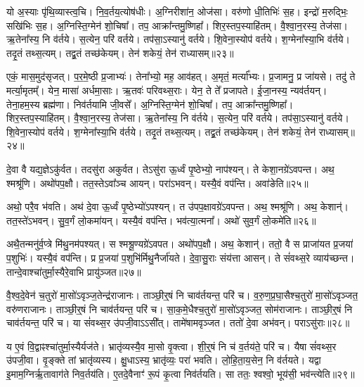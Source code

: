 यो अ॒स्याः पृ॑थि॒व्यास्त्व॒चि।
नि॒व॒र्तय॒त्योष॑धीः।
अ॒ग्निरीशा॑न॒ ओज॑सा।
वरु॑णो धी॒तिभिः॑ स॒ह।
इन्द्रो॑ म॒रुद्भिः॒ सखि॑भिः स॒ह।
अ॒ग्निस्ति॒ग्मेन॑ शो॒चिषा᳚।
तप॒ आक्रा᳚न्तमु॒ष्णिहा᳚।
शिर॒स्तप॒स्याहि॑तम्।
वै॒श्वा॒न॒रस्य॒ तेज॑सा।
ऋ॒तेना᳚स्य॒ नि व॑र्तये।
स॒त्येन॒ परि॑ वर्तये।
तप॑सा॒\-ऽस्यानु॑ वर्तये।
शि॒वेना॒स्योप॑ वर्तये।
श॒ग्मेना᳚स्या॒भि व॑र्तये।
तदृ॒तं तथ्स॒त्यम्।
तद्व्र॒तं तच्छ॑केयम्।
तेन॑ शकेयं॒ तेन॑ राध्यासम्॥२३॥\ip

एकं॒ मास॒मुद॑\-सृजत्।
प॒र॒मे॒ष्ठी प्र॒जाभ्यः॑।
तेना᳚भ्यो॒ मह॒ आव॑हत्।
अ॒मृतं॒ मर्त्या᳚भ्यः।
प्र॒जामनु॒ प्र जा॑यसे।
तदु॑ ते मर्त्या॒मृतम्᳚।
येन॒ मासा॑ अर्धमा॒साः।
ऋ॒तवः॑ परिवथ्स॒राः।
येन॒ ते ते᳚ प्रजापते।
ई॒जा॒नस्य॒ न्यव॑र्तयन्।
तेना॒हम॒स्य ब्रह्म॑णा।
निव॑र्तयामि जी॒वसे᳚।
अ॒ग्निस्ति॒ग्मेन॑ शो॒चिषा᳚।
तप॒ आक्रा᳚न्तमु॒ष्णिहा᳚।
शिर॒स्तप॒स्याहि॑तम्।
वै॒श्वा॒न॒रस्य॒ तेज॑सा।
ऋ॒तेना᳚स्य॒ नि व॑र्तये।
स॒त्येन॒ परि॑ वर्तये।
तप॑सा॒\-ऽस्यानु॑ वर्तये।
शि॒वेना॒स्योप॑ वर्तये।
श॒ग्मेना᳚स्या॒भि व॑र्तये।
तदृ॒तं तथ्स॒त्यम्।
तद्व्र॒तं तच्छ॑केयम्।
तेन॑ शकेयं॒ तेन॑ राध्यासम्॥२४॥\ip{}

दे॒वा वै यद्य॒ज्ञे\-ऽकु॑र्वत।
तदसु॑रा अकुर्वत।
तेऽसु॑रा ऊ॒र्ध्वं पृ॒ष्ठेभ्यो॒ नाप॑श्यन्।
ते केशा॒नग्रे॑\-ऽवपन्त।
अथ॒ श्मश्रू॑णि।
अथो॑प\-प॒क्षौ।
तत॒स्ते\-ऽवा᳚ञ्च आयन्।
परा॑ऽभवन्।
यस्यै॒वं वप॑न्ति।
अवा॑ङेति॥२५॥\ip

अथो॒ परै॒व भ॑वति।
अथ॑ दे॒वा ऊ॒र्ध्वं पृ॒ष्ठेभ्यो॑\-ऽपश्यन्।
त उ॑पप॒क्षावग्रे॑\-ऽवपन्त।
अथ॒ श्मश्रू॑णि।
अथ॒ केशान्॑।
तत॒स्ते॑\-ऽभवन्।
सु॒व॒र्गं लो॒कमा॑यन्।
यस्यै॒वं वप॑न्ति।
भव॑त्या॒त्मना᳚।
अथो॑ सुव॒र्गं लो॒कमे॑ति॥२६॥\ip

अथै॒तन्मनु॑र्व॒प्त्रे मि॑थु॒नम॑पश्यत्।
स श्मश्रू॒ण्यग्रे॑ऽवपत।
अथो॑पप॒क्षौ।
अथ॒ केशान्॑।
ततो॒ वै स प्राजा॑यत प्र॒जया॑ प॒शुभिः॑।
यस्यै॒वं वप॑न्ति।
प्र प्र॒जया॑ प॒शुभि॑र्मिथु॒नैर्जा॑यते।
दे॒वा॒सु॒राः संय॑त्ता आसन्।
ते सं॑वथ्स॒रे व्याय॑च्छन्त।
तान्दे॒वाश्चा॑तुर्मा॒स्यैरे॒वाभि प्रायु॑ञ्जत॥२७॥\ip

वै॒श्व॒दे॒वेन॑ च॒तुरो॑ मा॒सो॑\-ऽवृञ्ज॒तेन्द्र॑राजानः।
ताञ्छी॒र्॒षं नि चा\-व॑र्तयन्त॒ परि॑ च।
व॒रु॒ण॒प्र॒घा॒सैश्च॒तुरो॑ मा॒सो॑\-ऽवृञ्जत॒ वरु॑ण\-राजानः।
ताञ्छी॒र्॒षं नि चा\-व॑र्तयन्त॒ परि॑ च।
सा॒क॒मे॒धैश्च॒तुरो॑ मा॒सो॑\-ऽवृञ्जत॒ सोम॑\-राजानः।
ताञ्छी॒र्॒षं नि चा\-व॑र्तयन्त॒ परि॑ च।
या सं॑वथ्स॒र उ॑पजी॒वा\-ऽऽसी᳚त्।
तामे॑षामवृञ्जत।
ततो॑ दे॒वा अभ॑वन्।
पराऽसु॑राः॥२८॥\ip

य ए॒वं वि॒द्वाꣴश्चा॑तुर्मा॒स्यैर्यज॑ते।
भ्रातृ॑व्यस्यै॒व मा॒सो वृ॒क्त्वा।
शी॒र्॒षं नि च॑ व॒र्तय॑ते॒ परि॑ च।
यैषा सं॑वथ्स॒र उ॑पजी॒वा।
वृ॒ङ्क्ते तां भ्रातृ॑व्यस्य।
क्षु॒धा\-ऽस्य॒ भ्रातृ॑व्यः॒ परा॑ भवति।
लो॒हि॒ता॒य॒सेन॒ नि व॑र्तयते।
यद्वा इ॒माम॒ग्निर्\mbox{}ऋ॒तावाग॑ते निव॒र्तय॑ति।
ए॒तदे॒वैनाꣳ॑ रू॒पं कृ॒त्वा निव॑र्तयति।
सा ततः॒ श्वश्वो॒ भूय॑सी॒ भव॑न्त्येति॥२९॥\ip

